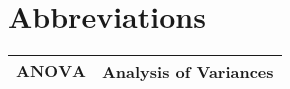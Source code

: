 
\section*{Abbreviations}

\hspace{20cm}

\begin{table}[H]

	\begin{tabular}{ll}
		\toprule
		$\textbf{ANOVA}$	& Analysis of Variances \\

 \bottomrule
	\end{tabular}
\end{table}